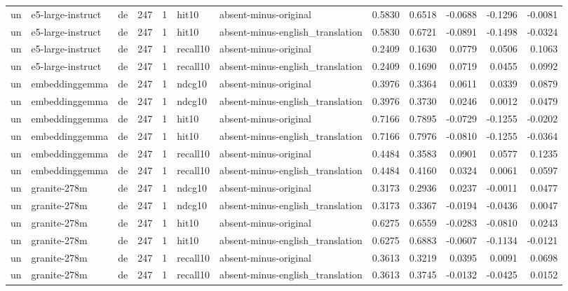 \begin{tabular}{lllrrllrrrrr}
un & e5-large-instruct & de & 247 & 1 & hit10 & absent-minus-original & 0.5830 & 0.6518 & -0.0688 & -0.1296 & -0.0081 \\
un & e5-large-instruct & de & 247 & 1 & hit10 & absent-minus-english\_translation & 0.5830 & 0.6721 & -0.0891 & -0.1498 & -0.0324 \\
un & e5-large-instruct & de & 247 & 1 & recall10 & absent-minus-original & 0.2409 & 0.1630 & 0.0779 & 0.0506 & 0.1063 \\
un & e5-large-instruct & de & 247 & 1 & recall10 & absent-minus-english\_translation & 0.2409 & 0.1690 & 0.0719 & 0.0455 & 0.0992 \\
un & embeddinggemma & de & 247 & 1 & ndcg10 & absent-minus-original & 0.3976 & 0.3364 & 0.0611 & 0.0339 & 0.0879 \\
un & embeddinggemma & de & 247 & 1 & ndcg10 & absent-minus-english\_translation & 0.3976 & 0.3730 & 0.0246 & 0.0012 & 0.0479 \\
un & embeddinggemma & de & 247 & 1 & hit10 & absent-minus-original & 0.7166 & 0.7895 & -0.0729 & -0.1255 & -0.0202 \\
un & embeddinggemma & de & 247 & 1 & hit10 & absent-minus-english\_translation & 0.7166 & 0.7976 & -0.0810 & -0.1255 & -0.0364 \\
un & embeddinggemma & de & 247 & 1 & recall10 & absent-minus-original & 0.4484 & 0.3583 & 0.0901 & 0.0577 & 0.1235 \\
un & embeddinggemma & de & 247 & 1 & recall10 & absent-minus-english\_translation & 0.4484 & 0.4160 & 0.0324 & 0.0061 & 0.0597 \\
un & granite-278m & de & 247 & 1 & ndcg10 & absent-minus-original & 0.3173 & 0.2936 & 0.0237 & -0.0011 & 0.0477 \\
un & granite-278m & de & 247 & 1 & ndcg10 & absent-minus-english\_translation & 0.3173 & 0.3367 & -0.0194 & -0.0436 & 0.0047 \\
un & granite-278m & de & 247 & 1 & hit10 & absent-minus-original & 0.6275 & 0.6559 & -0.0283 & -0.0810 & 0.0243 \\
un & granite-278m & de & 247 & 1 & hit10 & absent-minus-english\_translation & 0.6275 & 0.6883 & -0.0607 & -0.1134 & -0.0121 \\
un & granite-278m & de & 247 & 1 & recall10 & absent-minus-original & 0.3613 & 0.3219 & 0.0395 & 0.0091 & 0.0698 \\
un & granite-278m & de & 247 & 1 & recall10 & absent-minus-english\_translation & 0.3613 & 0.3745 & -0.0132 & -0.0425 & 0.0152 \\

\end{tabular}
